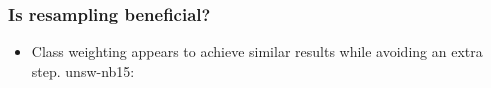 \documentclass{beamer}
\begin{document}
\begin{frame}
\frametitle{Is resampling beneficial?}
\begin{itemize}
\item
Class weighting appears to achieve similar results while avoiding an extra step.
unsw-nb15:
\end{itemize}
\end{frame}
\end{document}
